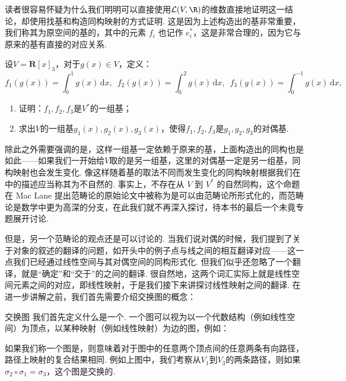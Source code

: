 读者很容易怀疑为什么我们明明可以直接使用$\mathcal{L}(V, \R)$的维数直接地证明这一结论，却使用找基和构造同构映射的方式证明. 这是因为上述构造出的基非常重要，我们称其为原空间的基的，其中的元素 $f_i$ 也记作 $e^*_i$，这是非常合理的，因为它与原来的基有直接的对应关系.

\begin{example}{}{}
    设$V=\mathbf{R}[x]_3$，对于$g(x)\in V$，定义：
    \[f_1(g(x))=\displaystyle\int_0^1g(x)\,\mathrm{d}x,\enspace f_2(g(x))=\int_0^2g(x)\,\mathrm{d}x,\enspace f_3(g(x))=\int_0^{-1}g(x)\,\mathrm{d}x,\]
    \begin{enumerate}
        \item 证明：$f_1,f_2,f_3$是$V^*$的一组基；

        \item 求出$V$的一组基$g_1(x),g_2(x),g_3(x)$，使得$f_1,f_2,f_3$是$g_1,g_2,g_3$的对偶基.
    \end{enumerate}
\end{example}

\begin{solution}

\end{solution}

除此之外需要强调的是，这样一组基一定依赖于原来的基，上面构造出的同构也是如此——如果我们一开始给$V$取的是另一组基，这里的对偶基一定是另一组基，同构映射也会发生变化. 像这样随着基的取法不同而发生变化的同构映射根据我们在中的描述应当称其为不自然的. 事实上，不存在从 $V$ 到 $V^*$ 的自然同构，这个命题在 Mac Lane 提出范畴论的原始论文中被称为是可以由范畴论所形式化的，而范畴论是数学中更为高深的分支，在此我们就不再深入探讨，待本书的最后一个未竟专题展开讨论.

但是，另一个范畴论的观点还是可以讨论的. 当我们说对偶的时候，我们提到了关于对象的叙述的翻译的问题，如开头中的例子点与线之间的相互翻译对应——这一点我们已经通过线性空间与其对偶空间的同构形式化. 但我们似乎还忽略了一个翻译，就是``确定''和``交于''的之间的翻译. 很自然地，这两个词汇实际上就是线性空间元素之间的对应，即线性映射，于是我们接下来讲探讨线性映射之间的翻译. 在进一步讲解之前，我们首先需要介绍交换图的概念：
\begin{definition}{交换图}{}
    我们首先定义什么是一个. 一个图可以视为以一个代数结构（例如线性空间）为顶点，以某种映射（例如线性映射）为边的图，例如：
    \begin{center}
    \end{center}
    如果我们称一个图是，则意味着对于图中的任意两个顶点间的任意两条有向路径，路径上映射的复合结果相同. 例如上图中，我们考察从$V_1$到$V_3$的两条路径，则如果$\sigma_2\circ\sigma_1=\sigma_3$，这个图是交换的.
\end{definition}

